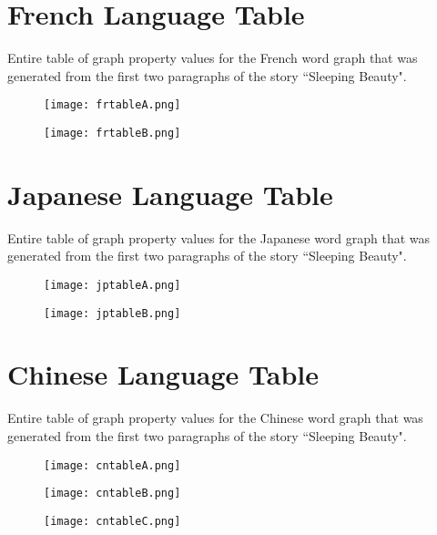 \begin{appendices}
\newpage
\section{French Language Table}\label{app:frtable}
Entire table of graph property values for the French word graph that was generated from the first two paragraphs of the story ``Sleeping Beauty".
\begin{figure}[H]
	\centering
	\texttt{[image: frtableA.png]}
\end{figure}
\begin{figure}[H]
	\centering
	\vspace{-1cm}
	\texttt{[image: frtableB.png]}
\end{figure}

\newpage
\section{Japanese Language Table}\label{app:jptable}
Entire table of graph property values for the Japanese word graph that was generated from the first two paragraphs of the story ``Sleeping Beauty".
\begin{figure}[H]
	\centering
	\texttt{[image: jptableA.png]}
\end{figure}
\begin{figure}[H]
	\centering
	\texttt{[image: jptableB.png]}
\end{figure}

\newpage
\section{Chinese Language Table}\label{app:cntable}
Entire table of graph property values for the Chinese word graph that was generated from the first two paragraphs of the story ``Sleeping Beauty".
\begin{figure}[H]
	\centering
	\texttt{[image: cntableA.png]}
\end{figure}
\begin{figure}[H]
	\centering
	\texttt{[image: cntableB.png]}
\end{figure}
\begin{figure}[H]
	\centering
	\texttt{[image: cntableC.png]}
\end{figure}

\end{appendices}